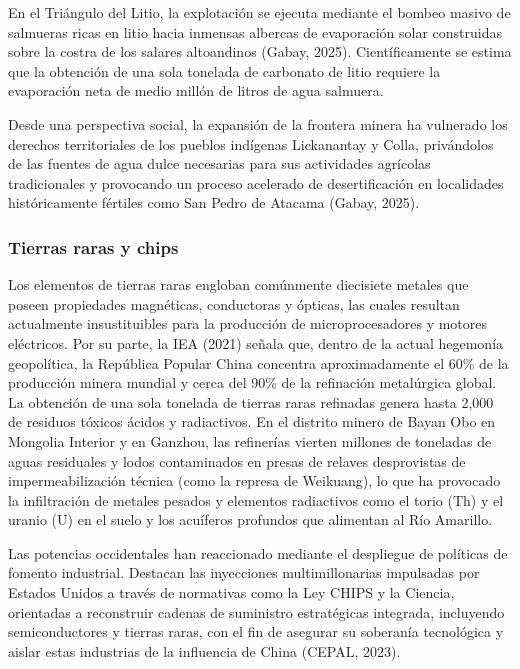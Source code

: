 \documentclass[stu,12pt,a4paper]{apa7}
\begin{document}
En el Triángulo del Litio, la explotación se ejecuta mediante el bombeo masivo de salmueras ricas en litio hacia inmensas albercas de evaporación solar construidas sobre la costra de los salares altoandinos (Gabay, 2025). Científicamente se estima que la obtención de una sola tonelada de carbonato de litio requiere la evaporación neta de medio millón de litros de agua salmuera.

Desde una perspectiva social, la expansión de la frontera minera ha vulnerado los derechos territoriales de los pueblos indígenas Lickanantay y Colla, privándolos de las fuentes de agua dulce necesarias para sus actividades agrícolas tradicionales y provocando un proceso acelerado de desertificación en localidades históricamente fértiles como San Pedro de Atacama (Gabay, 2025).

    \subsubsection{Tierras raras y chips}
Los elementos de tierras raras engloban comúnmente diecisiete metales que poseen propiedades magnéticas, conductoras y ópticas, las cuales resultan actualmente insustituibles para la producción de microprocesadores y motores eléctricos. Por su parte, la IEA (2021) señala que, dentro de la actual hegemonía geopolítica, la República Popular China concentra aproximadamente el 60\% de la producción minera mundial y cerca del 90\% de la refinación metalúrgica global.
La obtención de una sola tonelada de tierras raras refinadas genera hasta 2,000 de residuos tóxicos ácidos y radiactivos. En el distrito minero de Bayan Obo en Mongolia Interior y en Ganzhou, las refinerías vierten millones de toneladas de aguas residuales y lodos contaminados en presas de relaves desprovistas de impermeabilización técnica (como la represa de Weikuang), lo que ha provocado la infiltración de metales pesados y elementos radiactivos como el torio (Th) y el uranio (U) en el suelo y los acuíferos profundos que alimentan al Río Amarillo.

Las potencias occidentales han reaccionado mediante el despliegue de políticas de fomento industrial. Destacan las inyecciones multimillonarias impulsadas por Estados Unidos a través de normativas como la Ley CHIPS y la Ciencia, orientadas a reconstruir cadenas de suministro estratégicas integrada, incluyendo semiconductores y tierras raras, con el fin de asegurar su soberanía tecnológica y aislar estas industrias de la influencia de China (CEPAL, 2023).
\end{document}

